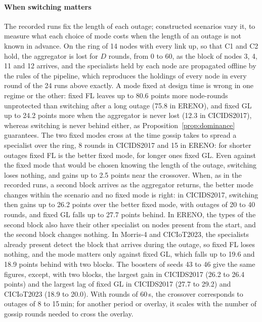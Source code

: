 
\paragraph{When switching matters}
The recorded runs fix the length of each outage; constructed scenarios vary it, to measure what
each choice of mode costs when the length of an outage is not known in advance. On the ring of 14
nodes with every link up, so that C1 and C2 hold, the aggregator is lost for $D$ rounds, from 0 to
60, as the block of nodes 3, 4, 11 and 12 arrives, and the specialists held by each node are
propagated offline by the rules of the pipeline, which reproduces the holdings of every node in
every round of the 24 runs above exactly. A mode fixed at design time is wrong in one regime or the
other: fixed FL leaves up to 80.6 points more node-rounds unprotected than switching after a long
outage (75.8 in ERENO), and fixed GL up to 24.2 points more when the aggregator is never lost (12.3
in CICIDS2017), whereas switching is never behind either, as Proposition~\ref{prop:dominance}
guarantees. The two fixed modes cross at the time gossip takes to spread a specialist over the
ring, 8 rounds in CICIDS2017 and 15 in ERENO: for shorter outages fixed FL is the better fixed
mode, for longer ones fixed GL. Even against the fixed mode that would be chosen knowing the length
of the outage, switching loses nothing, and gains up to 2.5 points near the crossover. When, as in
the recorded runs, a second block arrives as the aggregator returns, the better mode changes within
the scenario and no fixed mode is right: in CICIDS2017, switching then gains up to 26.2 points over
the better fixed mode, with outages of 20 to 40 rounds, and fixed GL falls up to 27.7 points
behind. In ERENO, the types of the second block also have their other specialist on nodes present
from the start, and the second block changes nothing. In Morris-4 and CICIoT2023, the specialists
already present detect the block that arrives during the outage, so fixed FL loses nothing, and
the mode matters only against fixed GL, which falls up to 19.6 and 18.9 points behind with two
blocks. The boosters of seeds 43 to 46 give the same figures, except, with two blocks, the largest
gain in CICIDS2017 (26.2 to 26.4 points) and the largest lag of fixed GL in CICIDS2017 (27.7 to
29.2) and CICIoT2023 (18.9 to 20.0). With rounds of 60\,s, the crossover corresponds to outages of 8
to 15\,min; for another period or overlay, it scales with the number of gossip rounds needed to
cross the overlay.

